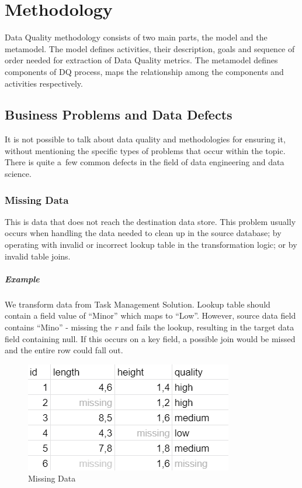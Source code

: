 \chapter{Methodology}\label{ch:methodology}

Data Quality methodology consists of two main parts, the model and the metamodel.
The model defines activities, their description, goals and sequence of order needed for extraction of Data Quality metrics.
The metamodel defines components of DQ process, maps the relationship among the components and activities respectively.

\section{Business Problems and Data Defects}

It is not possible to talk about data quality and methodologies for ensuring it, without mentioning the specific types of problems that occur within the topic.
There is quite a~few common defects in the field of data engineering and data science.

\subsection*{Missing Data}

This is data that does not reach the destination data store.
This problem usually occurs when handling the data needed to clean up in the source database; by operating with invalid or incorrect lookup table in the transformation logic; or by invalid table joins.

\paragraph*{Example} We transform data from Task Management Solution.
Lookup table should contain a field value of \enquote{Minor} which maps to \enquote{Low}.
However, source data field contains \enquote{Mino} - missing the \textit{r} and fails the lookup, resulting in the target data field containing null.
If this occurs on a key field, a possible join would be missed and the entire row could fall out.

\begin{figure}[htb]
    \centering
    \includegraphics[width=.5\textwidth]{figures/missing-data.png}
    \caption{Missing Data}
    \label{fig:missing-data}
\end{figure}
\FloatBarrier

